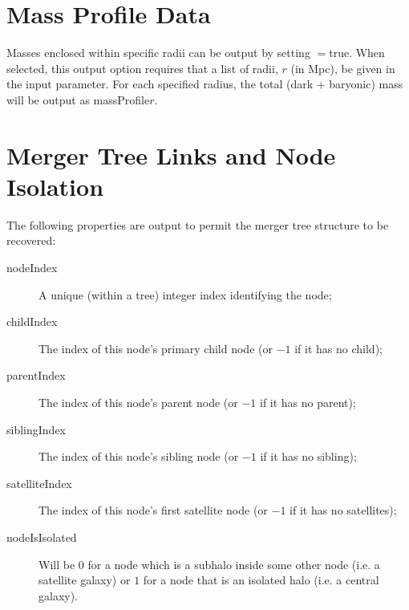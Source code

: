 \section{Mass Profile Data}

Masses enclosed within specific radii can be output by setting {\normalfont \ttfamily [outputMassProfileData]}$=${\normalfont \ttfamily true}. When selected, this output option requires that a list of radii, $r$ (in Mpc), be given in the {\normalfont \ttfamily [outputMassProfileRadii]} input parameter. For each specified radius, the total (dark + baryonic) mass will be output as {\normalfont \ttfamily massProfile}$r$.

\section{Merger Tree Links and Node Isolation}

The following properties are output to permit the merger tree structure to be recovered:
\begin{description}
 \item [{\normalfont \ttfamily nodeIndex}] A unique (within a tree) integer index identifying the node;
 \item [{\normalfont \ttfamily childIndex}] The index of this node's primary child node (or $-1$ if it has no child);
 \item [{\normalfont \ttfamily parentIndex}] The index of this node's parent node (or $-1$ if it has no parent);
 \item [{\normalfont \ttfamily siblingIndex}] The index of this node's sibling node (or $-1$ if it has no sibling);
 \item [{\normalfont \ttfamily satelliteIndex}] The index of this node's first satellite node (or $-1$ if it has no satellites);
 \item [{\normalfont \ttfamily nodeIsIsolated}] Will be $0$ for a node which is a subhalo inside some other node (i.e. a satellite galaxy) or $1$ for a node that is an isolated halo (i.e. a central galaxy).
\end{description}

